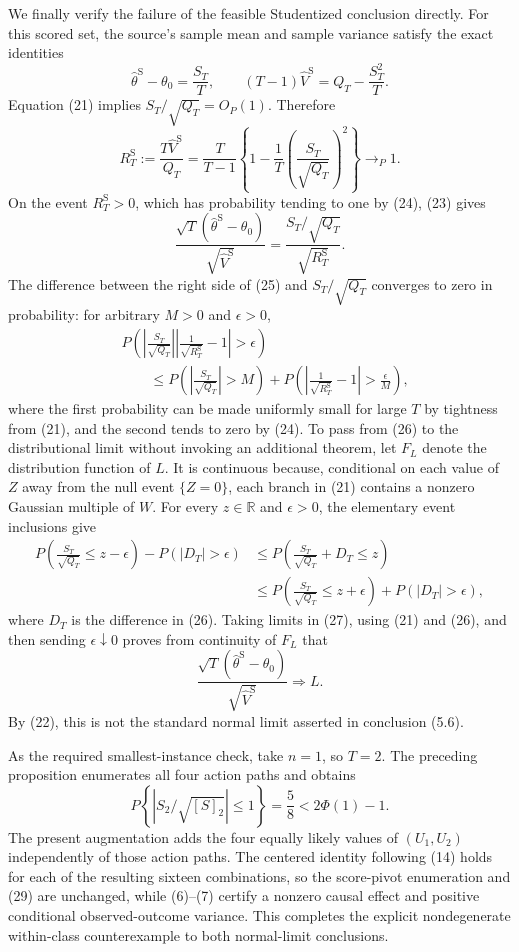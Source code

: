 We finally verify the failure of the feasible Studentized conclusion directly.  For this scored set, the source's sample mean and sample variance satisfy the exact identities
\[
 \widehat\theta^{\mathrm S}-\theta_0=\frac{S_T}{T},
 \qquad
 (T-1)\widehat V^{\mathrm S}
 =Q_T-\frac{S_T^2}{T}.
\tag{23}
\]
Equation (21) implies \(S_T/\sqrt{Q_T}=O_P(1)\).  Therefore
\[
 R_T^{\mathrm S}
 :=\frac{T\widehat V^{\mathrm S}}{Q_T}
 =\frac{T}{T-1}
 \left\{1-\frac1T
 \left(\frac{S_T}{\sqrt{Q_T}}\right)^2\right\}
 \longrightarrow_P1.
\tag{24}
\]
On the event \(R_T^{\mathrm S}>0\), which has probability tending to one by (24), (23) gives
\[
 \frac{\sqrt T(\widehat\theta^{\mathrm S}-\theta_0)}
      {\sqrt{\widehat V^{\mathrm S}}}
 =\frac{S_T/\sqrt{Q_T}}{\sqrt{R_T^{\mathrm S}}}.
\tag{25}
\]
The difference between the right side of (25) and \(S_T/\sqrt{Q_T}\) converges to zero in probability: for arbitrary \(M>0\) and \(\epsilon>0\),
\[
 \begin{aligned}
 &P\!\left(
 \left|\frac{S_T}{\sqrt{Q_T}}\right|
 \left|\frac1{\sqrt{R_T^{\mathrm S}}}-1\right|>\epsilon
 \right)\\
 &\qquad\le
 P\!\left(\left|\frac{S_T}{\sqrt{Q_T}}\right|>M\right)
 +P\!\left(\left|\frac1{\sqrt{R_T^{\mathrm S}}}-1\right|>\frac\epsilon M\right),
 \end{aligned}
\tag{26}
\]
where the first probability can be made uniformly small for large \(T\) by tightness from (21), and the second tends to zero by (24).  To pass from (26) to the distributional limit without invoking an additional theorem, let \(F_L\) denote the distribution function of \(L\).  It is continuous because, conditional on each value of \(Z\) away from the null event \(\{Z=0\}\), each branch in (21) contains a nonzero Gaussian multiple of \(W\).  For every \(z\in\mathbb R\) and \(\epsilon>0\), the elementary event inclusions give
\[
 \begin{aligned}
 P\!\left(\frac{S_T}{\sqrt{Q_T}}\le z-\epsilon\right)
 -P(|D_T|>\epsilon)
 &\le P\!\left(\frac{S_T}{\sqrt{Q_T}}+D_T\le z\right)\\
 &\le P\!\left(\frac{S_T}{\sqrt{Q_T}}\le z+\epsilon\right)
 +P(|D_T|>\epsilon),
 \end{aligned}
\tag{27}
\]
where \(D_T\) is the difference in (26).  Taking limits in (27), using (21) and (26), and then sending \(\epsilon\downarrow0\) proves from continuity of \(F_L\) that
\[
 \frac{\sqrt T(\widehat\theta^{\mathrm S}-\theta_0)}
      {\sqrt{\widehat V^{\mathrm S}}}
 \Longrightarrow L.
\tag{28}
\]
By (22), this is not the standard normal limit asserted in conclusion (5.6).

As the required smallest-instance check, take \(n=1\), so \(T=2\).  The preceding proposition enumerates all four action paths and obtains
\[
 P\!\left\{\left|S_2/\sqrt{[S]_2}\right|\le1\right\}=\frac58
 <2\Phi(1)-1.
\tag{29}
\]
The present augmentation adds the four equally likely values of \((U_1,U_2)\) independently of those action paths.  The centered identity following (14) holds for each of the resulting sixteen combinations, so the score-pivot enumeration and (29) are unchanged, while (6)--(7) certify a nonzero causal effect and positive conditional observed-outcome variance.  This completes the explicit nondegenerate within-class counterexample to both normal-limit conclusions.